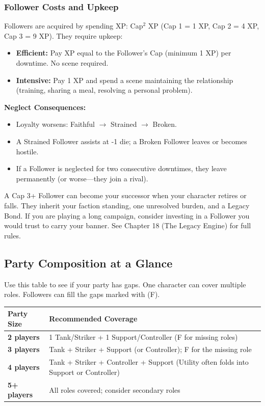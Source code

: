 \subsubsection{Follower Costs and Upkeep}

Followers are acquired by spending XP: Cap\(^2\) XP (Cap 1 = 1 XP, Cap 2 = 4 XP, Cap 3 = 9 XP). They require upkeep:

\begin{itemize}
  \item \textbf{Efficient:} Pay XP equal to the Follower's Cap (minimum 1 XP) per downtime. No scene required.
  \item \textbf{Intensive:} Pay 1 XP and spend a scene maintaining the relationship (training, sharing a meal, resolving a personal problem).
\end{itemize}

\textbf{Neglect Consequences:}
\begin{itemize}
  \item Loyalty worsens: Faithful $\rightarrow$ Strained $\rightarrow$ Broken.
  \item A Strained Follower assists at -1 die; a Broken Follower leaves or becomes hostile.
  \item If a Follower is neglected for two consecutive downtimes, they leave permanently (or worse---they join a rival).
\end{itemize}

\begin{tcolorbox}[colback=yellow!5!white,colframe=yellow!75!black,title=Player Tip: The Follower as Successor,breakable]
A Cap 3+ Follower can become your successor when your character retires or falls. They inherit your faction standing, one unresolved burden, and a Legacy Bond. If you are playing a long campaign, consider investing in a Follower you would trust to carry your banner. See Chapter 18 (The Legacy Engine) for full rules.
\end{tcolorbox}

\subsection{Party Composition at a Glance}

Use this table to see if your party has gaps. One character can cover multiple roles. Followers can fill the gaps marked with (F).

\begin{center}
\begin{tabular}{p{4cm}|p{6cm}}
\toprule
\textbf{Party Size} & \textbf{Recommended Coverage} \\
\midrule
\textbf{2 players} & 1 Tank/Striker + 1 Support/Controller (F for missing roles) \\
\textbf{3 players} & Tank + Striker + Support (or Controller); F for the missing role \\
\textbf{4 players} & Tank + Striker + Controller + Support (Utility often folds into Support or Controller) \\
\textbf{5+ players} & All roles covered; consider secondary roles \\
\bottomrule
\end{tabular}
\end{center}

